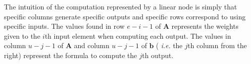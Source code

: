 

The intuition of the computation represented by a linear node is
simply that specific columns generate specific outputs and specific
rows correspond to using specific inputs.  The values found in row
$e-i-1$ of ${\mathbf A}$ represents the weights given to the $i$th
input element when computing each output.  The values in column
$u-j-1$ of ${\mathbf A}$ and column $u-j-1$ of ${\mathbf b}$ ({\it
i.e.} the $j$th column from the right) represent the formula to
compute the $j$th output.